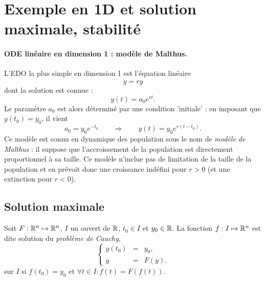 \section{Exemple en 1D et solution maximale, stabilité} \label{sec:EquaDiff-1DsolMaximale}

\paragraph*{ODE linéaire en dimension 1 : modèle de Malthus.}
L'EDO la plus simple en dimension 1 est l'équation linéaire
$$
\dot y = r y
$$
dont la solution est connue : 
$$
y(t) = a_0 e^{rt}.
$$
Le paramètre $a_0$ est alors déterminé par une condition 'initiale' : en imposant que $y(t_0) = y_0$, il vient
$$
a_0 = y_0 e^{-t_0} 
\qquad \Rightarrow \qquad
y(t) = y_0 e^{r(t-t_0)}.
$$
Ce modèle est connu en dynamique des population sous le nom de {\em modèle de Malthus} : il suppose que l'accroissement de la population est directement proportionnel à sa taille. Ce modèle n'inclue pas de limitation de la taille de la population et en prévoit donc une croissance indéfini pour $r > 0$ (et une extinction pour $r < 0$).


\subsection{Solution maximale} 

\begin{definition}
  Soit $F : \mathbb{R}^n \mapsto \mathbb{R}^n$, $I$ un ouvert de $\mathbb{R}$, $t_0 \in I$ et $y_0 \in \mathbb{R}$. La fonction $f : I \mapsto \mathbb{R}^n$ est dite solution du \emph{problème de Cauchy}, 
  $$
  \left\{\begin{array}{rcl}
          y(t_0) & = & y_0, \\
          \dot y & = & F(y).
        \end{array}\right.
  $$
  sur $I$ si $f(t_0) = y_0$ et $\forall t \in I: \dot f(t) = F(f(t))$.
\end{definition}

